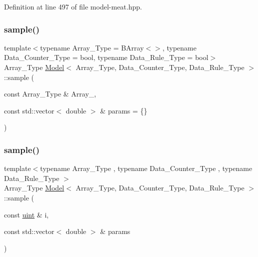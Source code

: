 Definition at line 497 of file model-\/meat.\+hpp.

\mbox{\label{class_model_a59e37db45e1751a6205db129a5c114c1}} 
\subsubsection{\texorpdfstring{sample()}{sample()}\hspace{0.1cm}{\footnotesize\ttfamily [1/2]}}
{\footnotesize\ttfamily template$<$typename Array\+\_\+\+Type = B\+Array$<$$>$, typename Data\+\_\+\+Counter\+\_\+\+Type = bool, typename Data\+\_\+\+Rule\+\_\+\+Type = bool$>$ \\
Array\+\_\+\+Type \hyperlink{class_model}{Model}$<$ Array\+\_\+\+Type, Data\+\_\+\+Counter\+\_\+\+Type, Data\+\_\+\+Rule\+\_\+\+Type $>$\+::sample (\begin{DoxyParamCaption}\item[{const Array\+\_\+\+Type \&}]{Array\+\_\+,  }\item[{const std\+::vector$<$ double $>$ \&}]{params = {\ttfamily \{\}} }\end{DoxyParamCaption})}

\mbox{\label{class_model_a7fb66a67707f610b70ee05b814373f49}} 
\subsubsection{\texorpdfstring{sample()}{sample()}\hspace{0.1cm}{\footnotesize\ttfamily [2/2]}}
{\footnotesize\ttfamily template$<$typename Array\+\_\+\+Type , typename Data\+\_\+\+Counter\+\_\+\+Type , typename Data\+\_\+\+Rule\+\_\+\+Type $>$ \\
Array\+\_\+\+Type \hyperlink{class_model}{Model}$<$ Array\+\_\+\+Type, Data\+\_\+\+Counter\+\_\+\+Type, Data\+\_\+\+Rule\+\_\+\+Type $>$\+::sample (\begin{DoxyParamCaption}\item[{const \hyperlink{typedefs_8hpp_a91ad9478d81a7aaf2593e8d9c3d06a14}{uint} \&}]{i,  }\item[{const std\+::vector$<$ double $>$ \&}]{params }\end{DoxyParamCaption})\hspace{0.3cm}{\ttfamily [inline]}}



